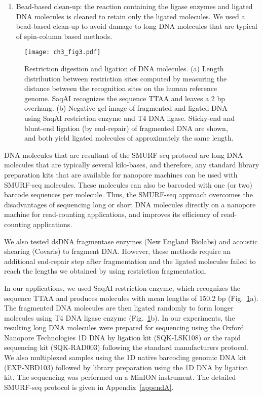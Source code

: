 \begin{enumerate}
\item Bead-based clean-up: the reaction containing the ligase enzymes and
  ligated DNA molecules is cleaned to retain only the ligated molecules. We
  used a bead-based clean-up to avoid damage to long DNA
  molecules that are typical of spin-column based methods.
\end{enumerate}

\begin{figure}[b!]
\centering
\texttt{[image: ch3\_fig3.pdf]}
\caption[Restriction digestion and ligation of DNA molecules.]{
  Restriction digestion and ligation of DNA molecules.
  (a) Length distribution between restriction sites computed
  by measuring the distance between the recognition sites on the human
  reference genome. SaqAI recognizes the sequence TTAA and leaves a 2 bp
  overhang.
  (b) Negative gel image of fragmented and ligated DNA
  using SaqAI restriction enzyme and T4 DNA ligase.  Sticky-end and
  blunt-end ligation (by end-repair) of fragmented DNA are shown, and
  both yield ligated molecules of approximately the same length.}
\label{re_frag}
\end{figure}

DNA molecules that are resultant of the SMURF-seq protocol are long DNA
molecules that are typically several kilo-bases, and therefore, any
standard library preparation kits that are available for nanopore
machines can be used with SMURF-seq molecules. These molecules can also
be barcoded with one (or two) barcode sequences per molecule. Thus, the
SMURF-seq approach overcomes the disadvantages of sequencing long or
short DNA molecules directly on a nanopore machine for read-counting
applications, and improves its efficiency of read-counting applications.

We also tested dsDNA fragmentase enzymes (New England Biolabs) and
acoustic shearing (Covaris) to fragment DNA. However, these methods
require an additional end-repair step after fragmentation and the
ligated molecules failed to reach the lengths we obtained by using
restriction fragmentation.

In our applications, we used SaqAI restriction enzyme, which recognizes
the sequence TTAA and produces molecules with mean lengths of 150.2 bp
(Fig.~\ref{re_frag}a).
The fragmented DNA molecules are then ligated randomly to form longer
molecules using T4 DNA ligase enzyme (Fig.~\ref{re_frag}b).
%
In our experiments, the resulting long DNA molecules were prepared for
sequencing using the Oxford Nanopore Technologies 1D DNA by ligation kit
(SQK-LSK108) or the rapid sequencing kit (SQK-RAD003) following the
standard manufacturers protocol. We also multiplexed samples using the
1D native barcoding genomic DNA kit (EXP-NBD103) followed by library
preparation using the 1D DNA by ligation kit. The sequencing was
performed on a MinION instrument.
%
The detailed SMURF-seq protocol is given in Appendix~\ref{appendA}.


